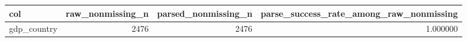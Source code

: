 \begin{tabular}{lrrr}
\toprule
col & raw\_nonmissing\_n & parsed\_nonmissing\_n & parse\_success\_rate\_among\_raw\_nonmissing \\
\midrule
gdp\_country & 2476 & 2476 & 1.000000 \\
\bottomrule
\end{tabular}
